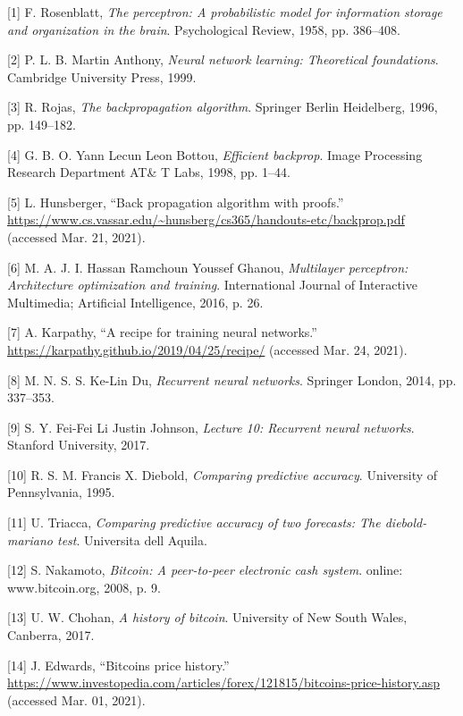 \documentclass[
]{article}
\newenvironment{cslreferences}%
  {}%
  {\par}
\begin{document}
\hypertarget{refs}{}
\begin{cslreferences}
\leavevmode\hypertarget{ref-perceptron_paper}{}%
{[}1{]} F. Rosenblatt, \emph{The perceptron: A probabilistic model for
information storage and organization in the brain}. Psychological
Review, 1958, pp. 386--408.

\leavevmode\hypertarget{ref-nn_learning_theoretical_foundations}{}%
{[}2{]} P. L. B. Martin Anthony, \emph{Neural network learning:
Theoretical foundations}. Cambridge University Press, 1999.

\leavevmode\hypertarget{ref-backpropagation}{}%
{[}3{]} R. Rojas, \emph{The backpropagation algorithm}. Springer Berlin
Heidelberg, 1996, pp. 149--182.

\leavevmode\hypertarget{ref-efficient_backprop}{}%
{[}4{]} G. B. O. Yann Lecun Leon Bottou, \emph{Efficient backprop}.
Image Processing Research Department AT\& T Labs, 1998, pp. 1--44.

\leavevmode\hypertarget{ref-backpropagation_proofs}{}%
{[}5{]} L. Hunsberger, ``Back propagation algorithm with proofs.''
\url{https://www.cs.vassar.edu/~hunsberg/cs365/handouts-etc/backprop.pdf}
(accessed Mar. 21, 2021).

\leavevmode\hypertarget{ref-mlp_architecture}{}%
{[}6{]} M. A. J. I. Hassan Ramchoun Youssef Ghanou, \emph{Multilayer
perceptron: Architecture optimization and training}. International
Journal of Interactive Multimedia; Artificial Intelligence, 2016, p. 26.

\leavevmode\hypertarget{ref-recipe_training}{}%
{[}7{]} A. Karpathy, ``A recipe for training neural networks.''
\url{https://karpathy.github.io/2019/04/25/recipe/} (accessed Mar. 24,
2021).

\leavevmode\hypertarget{ref-RNN}{}%
{[}8{]} M. N. S. S. Ke-Lin Du, \emph{Recurrent neural networks}.
Springer London, 2014, pp. 337--353.

\leavevmode\hypertarget{ref-RNN_Stanford}{}%
{[}9{]} S. Y. Fei-Fei Li Justin Johnson, \emph{Lecture 10: Recurrent
neural networks}. Stanford University, 2017.

\leavevmode\hypertarget{ref-DM_paper}{}%
{[}10{]} R. S. M. Francis X. Diebold, \emph{Comparing predictive
accuracy}. University of Pennsylvania, 1995.

\leavevmode\hypertarget{ref-DM_lecture}{}%
{[}11{]} U. Triacca, \emph{Comparing predictive accuracy of two
forecasts: The diebold-mariano test}. Universita dell Aquila.

\leavevmode\hypertarget{ref-bitcoin}{}%
{[}12{]} S. Nakamoto, \emph{Bitcoin: A peer-to-peer electronic cash
system}. online: www.bitcoin.org, 2008, p. 9.

\leavevmode\hypertarget{ref-A_History_of_Bitcoin}{}%
{[}13{]} U. W. Chohan, \emph{A history of bitcoin}. University of New
South Wales, Canberra, 2017.

\leavevmode\hypertarget{ref-Bitcoin_history}{}%
{[}14{]} J. Edwards, ``Bitcoins price history.''
\url{https://www.investopedia.com/articles/forex/121815/bitcoins-price-history.asp}
(accessed Mar. 01, 2021).
\end{cslreferences}
\end{document}
